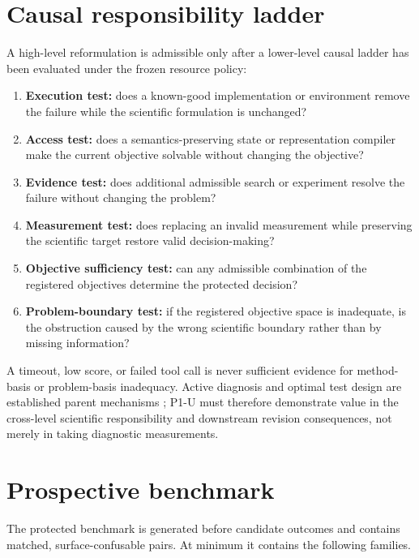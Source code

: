 \documentclass[11pt]{article}
\begin{document}
\section{Causal responsibility ladder}
A high-level reformulation is admissible only after a lower-level causal ladder has been evaluated under the frozen resource policy:
\begin{enumerate}[leftmargin=*]
    \item \textbf{Execution test:} does a known-good implementation or environment remove the failure while the scientific formulation is unchanged?
    \item \textbf{Access test:} does a semantics-preserving state or representation compiler make the current objective solvable without changing the objective?
    \item \textbf{Evidence test:} does additional admissible search or experiment resolve the failure without changing the problem?
    \item \textbf{Measurement test:} does replacing an invalid measurement while preserving the scientific target restore valid decision-making?
    \item \textbf{Objective sufficiency test:} can any admissible combination of the registered objectives determine the protected decision?
    \item \textbf{Problem-boundary test:} if the registered objective space is inadequate, is the obstruction caused by the wrong scientific boundary rather than by missing information?
\end{enumerate}

A timeout, low score, or failed tool call is never sufficient evidence for method-basis or problem-basis inadequacy. Active diagnosis and optimal test design are established parent mechanisms \cite{activefault2019}; P1-U must therefore demonstrate value in the cross-level scientific responsibility and downstream revision consequences, not merely in taking diagnostic measurements.

\section{Prospective benchmark}
The protected benchmark is generated before candidate outcomes and contains matched, surface-confusable pairs. At minimum it contains the following families.
\end{document}
